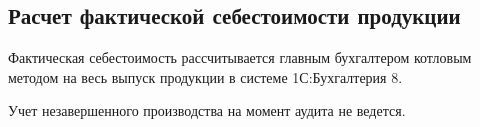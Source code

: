 \subsection{Расчет фактической себестоимости продукции}
Фактическая себестоимость рассчитывается главным бухгалтером котловым методом на весь выпуск продукции в системе 1С:Бухгалтерия 8. 

Учет незавершенного производства на момент аудита не ведется.

